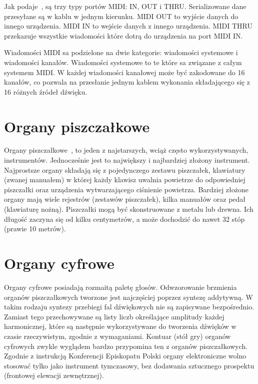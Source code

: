 \documentclass[11pt]{report}
\begin{document}
    Jak podaje~\cite{122929520160101}, są trzy typy portów MIDI: IN, OUT i THRU.
    Serializowane dane przesyłane są w kablu w jednym kierunku.
    MIDI OUT to wyjście danych do innego urządzenia.
    MIDI IN to wejście danych z innego urządzenia.
    MIDI THRU przekazuje wszystkie wiadomości które dotrą do urządzenia na port MIDI IN.

    Wiadomości MIDI sa podzielone na dwie kategorie: wiadomości systemowe i wiadomości kanałów.
    Wiadomości systemowe to te które sa związane z całym systemem MIDI.
    W każdej wiadomości kanałowej może być zakodowane do 16 kanałów, co pozwala na przesłanie jednym kablem wykonania składającego się z 16 różnych źródeł dźwięku.


    \section{Organy piszczałkowe}\label{sec:organy-piszczałkowe}
    Organy piszczałkowe~\cite{329316420170801}, to jeden z najstarszych, wciąż często wykorzystywanych, instrumentów.
    Jednocześnie jest to największy i najbardziej złożony instrument.
    Najprostsze organy składają się z pojedynczego zestawu piszczałek, klawiatury (zwanej manuałem) w której każdy klawisz uwalnia powietrze do odpowiedniej piszczałki oraz urządzenia wytwarzającego ciśnienie powietrza.
    Bardziej złożone organy mają wiele rejestrów (zestawów piszczałek), kilka manuałów oraz pedał (klawiaturę nożną).
    Piszczałki mogą być skonstruowane z metalu lub drewna.
    Ich długość zaczyna się od kilku centymetrów, a może dochodzić do nawet 32 stóp (prawie 10 metrów).


    \section{Organy cyfrowe}\label{sec:organy-cyfrowe}
    Organy cyfrowe posiadają rozmaitą paletę głosów.
    Odwzorowanie brzmienia organów piszczałkowych tworzone jest najczęściej poprzez syntezę addytywną.
    W takim rodzaju syntezy przebiegi fal dźwiękowych nie są zapisywane bezpośrednio.
    Zamiast tego przechowywane są listy liczb określające amplitudy każdej harmonicznej,
    które są następnie wykorzystywane do tworzenia dźwięków w czasie rzeczywistym, zgodnie z wymaganiami.
    Kontuar (stół gry) organów cyfrowych zwykle wyglądem bardzo przypomina ten z organów piszczałkowych.
    Zgodnie z instrukcją Konferencji Episkopatu Polski organy elektroniczne wolno stosować tylko jako instrument tymczasowy,
    bez dodawania sztucznego prospektu (frontowej elewacji zewnętrznej).
\end{document}
